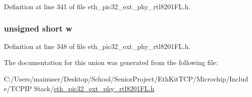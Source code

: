 Definition at line 341 of file eth\+\_\+pic32\+\_\+ext\+\_\+phy\+\_\+rtl8201\+F\+L.\+h.

\hypertarget{union___f_i_b_e_r_m_o_d_e_a_n_d_l_o_o_p_b_a_c_k_m_o_d_e__t_a160850a4684a3e82c2323033964f2e98}{}
\subsubsection[{w}]{\setlength{\rightskip}{0pt plus 5cm}unsigned short w}\label{union___f_i_b_e_r_m_o_d_e_a_n_d_l_o_o_p_b_a_c_k_m_o_d_e__t_a160850a4684a3e82c2323033964f2e98}


Definition at line 348 of file eth\+\_\+pic32\+\_\+ext\+\_\+phy\+\_\+rtl8201\+F\+L.\+h.



The documentation for this union was generated from the following file\+:\begin{DoxyCompactItemize}
\item 
C\+:/\+Users/mainuser/\+Desktop/\+School/\+Senior\+Project/\+Eth\+Kit\+T\+C\+P/\+Microchip/\+Include/\+T\+C\+P\+I\+P Stack/\hyperlink{eth__pic32__ext__phy__rtl8201_f_l_8h}{eth\+\_\+pic32\+\_\+ext\+\_\+phy\+\_\+rtl8201\+F\+L.\+h}\end{DoxyCompactItemize}
